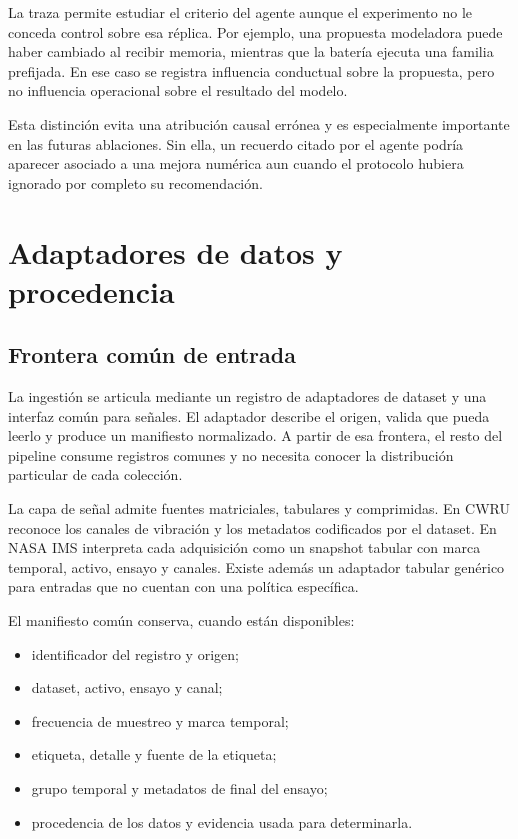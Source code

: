 La traza permite estudiar el criterio del agente aunque el experimento no le
conceda control sobre esa réplica. Por ejemplo, una propuesta modeladora puede
haber cambiado al recibir memoria, mientras que la batería ejecuta una familia
prefijada. En ese caso se registra influencia conductual sobre la propuesta,
pero no influencia operacional sobre el resultado del modelo.

Esta distinción evita una atribución causal errónea y es especialmente
importante en las futuras ablaciones. Sin ella, un recuerdo citado por el
agente podría aparecer asociado a una mejora numérica aun cuando el protocolo
hubiera ignorado por completo su recomendación.

\section{Adaptadores de datos y procedencia}

\subsection{Frontera común de entrada}

La ingestión se articula mediante un registro de adaptadores de dataset y una
interfaz común para señales. El adaptador describe el origen, valida que pueda
leerlo y produce un manifiesto normalizado. A partir de esa frontera, el resto
del pipeline consume registros comunes y no necesita conocer la distribución
particular de cada colección.

La capa de señal admite fuentes matriciales, tabulares y comprimidas. En CWRU
reconoce los canales de vibración y los metadatos codificados por el dataset.
En NASA IMS interpreta cada adquisición como un snapshot tabular con marca
temporal, activo, ensayo y canales. Existe además un adaptador tabular genérico
para entradas que no cuentan con una política específica.

El manifiesto común conserva, cuando están disponibles:

\begin{itemize}
  \item identificador del registro y origen;
  \item dataset, activo, ensayo y canal;
  \item frecuencia de muestreo y marca temporal;
  \item etiqueta, detalle y fuente de la etiqueta;
  \item grupo temporal y metadatos de final del ensayo;
  \item procedencia de los datos y evidencia usada para determinarla.
\end{itemize}

